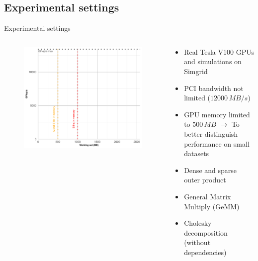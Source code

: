 \documentclass{libs/ufc_format}
\begin{document}
\subsection{Experimental settings}
\begin{frame}{Experimental settings}
    \begin{columns}{}
        \begin{column}{0.4\textwidth}
            \justify
            \begin{figure}
				\centering
				\includegraphics[scale=0.29]{Images/example_lines.pdf}
			\end{figure}

        \end{column}
        \begin{column}{0.6\textwidth}
        \begin{block}{}
            \begin{itemize}
				\item Real Tesla V100 GPUs and simulations on Simgrid
				\item PCI bandwidth not limited ($12000\,MB/s$)
				\item GPU memory limited to $500\,MB$ $\rightarrow$ To better distinguish performance on small datasets
			\end{itemize}
		\end{block}
			\begin{block}{}
			\begin{itemize}
				\item Dense and sparse outer product
				\item General Matrix Multiply (GeMM)
				\item Cholesky decomposition (without dependencies)
			\end{itemize}
			\end{block}
        \end{column}
    \end{columns}
\end{frame}
\end{document}
